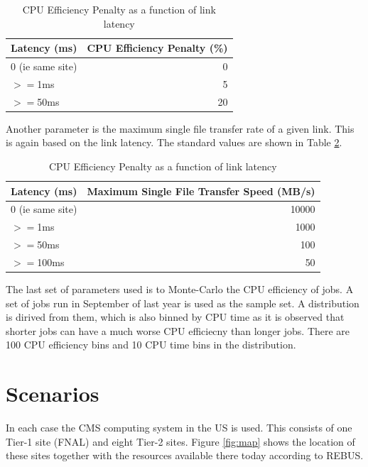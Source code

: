 \documentclass[a4paper]{jpconf}
\begin{document}
\begin{table}
  \begin{center}
    \begin{tabular}{|l|r|}
      \hline
      Latency (ms) & CPU Efficiency Penalty (\%) \\
      \hline
      0 (ie same site) & 0 \\
      $>=$1ms & 5 \\
      $>=$50ms & 20 \\
      \hline
    \end{tabular}
    \caption{CPU Efficiency Penalty as a function of link latency\label{tab:cpuHIT}}
  \end{center}
\end{table}

Another parameter is the maximum single file transfer rate of a given
link. This is again based on the link latency. The standard values are
shown in Table \ref{tab:linkLatency}.

\begin{table}
  \begin{center}
    \begin{tabular}{|l|r|}
      \hline
      Latency (ms) &  Maximum Single File Transfer Speed (MB/s) \\
      \hline
      0 (ie same site) & 10000 \\
      $>=$1ms & 1000 \\
      $>=$50ms & 100 \\
      $>=$100ms & 50 \\
      \hline
    \end{tabular}
    \caption{CPU Efficiency Penalty as a function of link
      latency\label{tab:linkLatency}}
  \end{center}
\end{table}

The last set of parameters used is to Monte-Carlo the CPU efficiency
of jobs. A set of jobs run in September of last year is used as the
sample set. A distribution is dirived from them, which is also binned
by CPU time as it is observed that shorter jobs can have a much worse
CPU efficiecny than longer jobs. There are 100 CPU efficiency bins and
10 CPU time bins in the distribution.

\section{Scenarios}

In each case the CMS computing system in the US is used. This consists
of one Tier-1 site (FNAL) and eight Tier-2 sites. Figure \ref{fig:map}
shows the location of these sites together with the resources
available there today according to REBUS.
\end{document}
